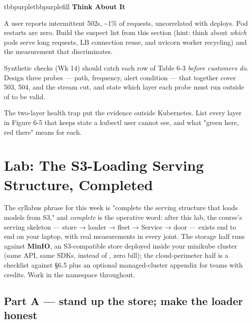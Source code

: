 \begin{calloutbox}{tbbpurple}{tbbpurplefill}
{\normalsize\bfseries\color{tbbpurple}Think About It}\par\vspace{3pt}
\begin{tbbitemize}
  \item A user reports intermittent 502s, \textasciitilde{}1\% of requests, uncorrelated with deploys. Pod restarts are zero. Build the suspect list from this section (hint: think about \textit{which} pods serve long requests, LB connection reuse, and uvicorn worker recycling) and the measurement that discriminates.
  \item Synthetic checks (Wk 14) should catch each row of Table 6-3 \textit{before customers do}. Design three probes — path, frequency, alert condition — that together cover 503, 504, and the stream cut, and state which layer each probe must run outside of to be valid.
  \item The two-layer health trap put the evidence outside Kubernetes. List every layer in Figure 6-5 that keeps state a kubectl user cannot see, and what "green here, red there" means for each.
\end{tbbitemize}
\end{calloutbox}

\section{Lab: The S3-Loading Serving Structure, Completed}

The syllabus phrase for this week is "complete the serving structure that loads models from S3," and \textit{complete} is the operative word: after this lab, the course's serving skeleton — store → loader → fleet → Service → door — exists end to end on your laptop, with real measurements in every joint. The storage half runs against \textbf{MinIO}, an S3-compatible store deployed inside your minikube cluster (same API, same SDKs,  instead of , zero bill); the cloud-perimeter half is a checklist against §6.5 plus an optional managed-cluster appendix for teams with credits. Work in the  namespace throughout.

\subsection*{Part A — stand up the store; make the loader honest}

